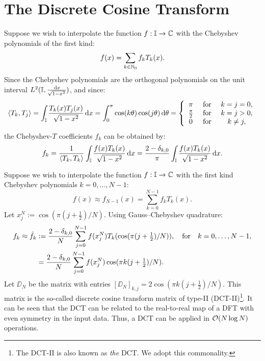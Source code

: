 \section{The Discrete Cosine Transform}

Suppose we wish to interpolate the function $f:\mathbb{I}\to\mathbb{C}$ with the Chebyshev polynomials of the first kind:
\begin{equation}
f(x) = \sum_{k\in\mathbb{N}_0} f_k T_k(x).
\end{equation}
Since the Chebyshev polynomials are the orthogonal polynomials on the unit interval $L^2(\mathbb{I},\tfrac{{\rm\,d} x}{\sqrt{1-x^2}})$, and since:
\begin{equation}
\langle T_k, T_j\rangle = \int_{\mathbb{I}}\dfrac{T_k(x)T_j(x)}{\sqrt{1-x^2}}{\rm\,d} x = \int_0^\pi \cos(k\theta)\cos(j\theta){\rm\,d}\theta = \left\{\begin{array}{ccc}\pi & \hbox{ for } & k = j = 0,\\
\frac{\pi}{2} & \hbox{ for } & k = j > 0,\\
0 & \hbox{ for } & k \ne j,
\end{array}\right.
\end{equation}
the Chebyshev-$T$ coefficients $f_k$ can be obtained by:
\begin{equation}
f_k = \dfrac{1}{\langle T_k,T_k\rangle}\int_{\mathbb{I}} \dfrac{f(x)T_k(x)}{\sqrt{1-x^2}}{\rm\,d} x = \dfrac{2-\delta_{k,0}}{\pi}\int_{\mathbb{I}} \dfrac{f(x)T_k(x)}{\sqrt{1-x^2}}{\rm\,d} x.
\end{equation}

Suppose we wish to interpolate the function $f:\mathbb{I}\to\mathbb{C}$ with the first kind Chebyshev polynomials $k=0,\ldots,N-1$:
\begin{equation}
f(x) \approx f_{N-1}(x) = \sum_{k=0}^{N-1} f_k T_k(x).
\end{equation}
Let $x_j^N := \cos(\pi(j+\tfrac{1}{2})/N)$. Using Gauss--Chebyshev quadrature:
\begin{align}
f_k \approx \hat{f}_k & := \dfrac{2-\delta_{k,0}}{N}\sum_{j=0}^{N-1} f(x_j^N)T_k(\cos(\pi (j+\tfrac{1}{2})/N)),\quad{\rm for}\quad k=0,\ldots,N-1,\\
& = \dfrac{2-\delta_{k,0}}{N}\sum_{j=0}^{N-1} f(x_j^N)\cos(\pi k(j+\tfrac{1}{2})/N).
\end{align}
Let $\DD_N$ be the matrix with entries $[\DD_N]_{k,j} = 2\cos(\pi k(j+\frac{1}{2})/N)$. This matrix is the so-called discrete cosine transform matrix of type-II (DCT-II)\footnote{The DCT-II is also known as {\em the} DCT. We adopt this commonality.}. It can be seen that the DCT can be related to the real-to-real map of a DFT with even symmetry in the input data. Thus, a DCT can be applied in $\mathcal{O}(N\log N)$ operations.

